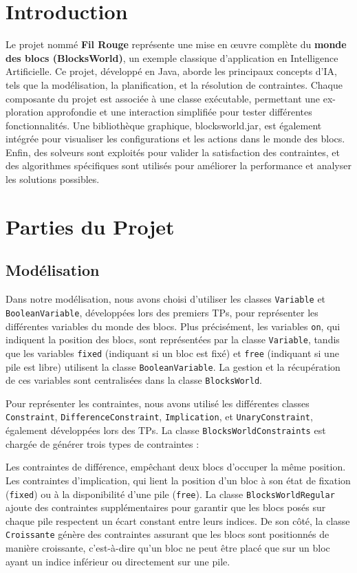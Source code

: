 \documentclass[12pt]{article}
\begin{document}
\section{Introduction}
Le projet nommé {\bf Fil Rouge} représente une mise en œuvre complète du {\bf monde des
blocs (BlocksWorld)}, un exemple classique d’application en Intelligence Artificielle. Ce
projet, développé en Java, aborde les principaux concepts d’IA, tels que la modélisation,
la planification, et la résolution de contraintes. \newline
Chaque composante du projet est associée à une classe exécutable, permettant une ex-
ploration approfondie et une interaction simplifiée pour tester différentes fonctionnalités.
Une bibliothèque graphique, blocksworld.jar, est également intégrée pour visualiser les
configurations et les actions dans le monde des blocs.
\newline
Enfin, des solveurs sont exploités pour valider la satisfaction des contraintes, et des
algorithmes spécifiques sont utilisés pour améliorer la performance et analyser les solutions
possibles.

\section{Parties du Projet}
\subsection{Modélisation}
Dans notre modélisation, nous avons choisi d'utiliser les classes \texttt{Variable} et \texttt{BooleanVariable}, développées lors des premiers TPs, pour représenter les différentes variables du monde des blocs. Plus précisément, les variables \texttt{on}, qui indiquent la position des blocs, sont représentées par la classe \texttt{Variable}, tandis que les variables \texttt{fixed} (indiquant si un bloc est fixé) et \texttt{free} (indiquant si une pile est libre) utilisent la classe \texttt{BooleanVariable}. La gestion et la récupération de ces variables sont centralisées dans la classe \texttt{BlocksWorld}.

Pour représenter les contraintes, nous avons utilisé les différentes classes \texttt{Constraint}, \texttt{DifferenceConstraint}, \texttt{Implication}, et \texttt{UnaryConstraint}, également développées lors des TPs. La classe \texttt{BlocksWorldConstraints} est chargée de générer trois types de contraintes :

Les contraintes de différence, empêchant deux blocs d'occuper la même position.
Les contraintes d'implication, qui lient la position d'un bloc à son état de fixation (\texttt{fixed}) ou à la disponibilité d'une pile (\texttt{free}).
La classe \texttt{BlocksWorldRegular} ajoute des contraintes supplémentaires pour garantir que les blocs posés sur chaque pile respectent un écart constant entre leurs indices. De son côté, la classe \texttt{Croissante} génère des contraintes assurant que les blocs sont positionnés de manière croissante, c'est-à-dire qu'un bloc ne peut être placé que sur un bloc ayant un indice inférieur ou directement sur une pile.
\end{document}
